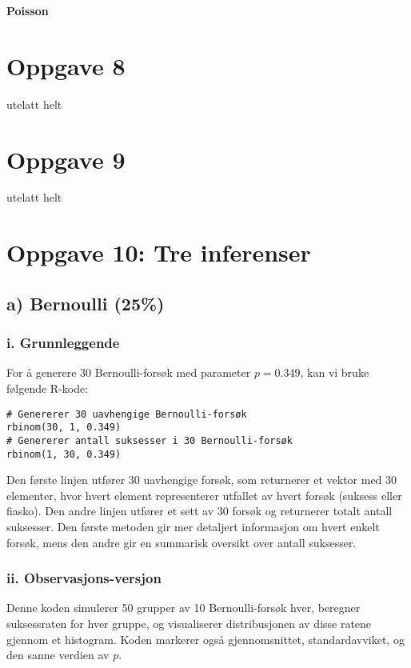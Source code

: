 \documentclass{article}
\begin{document}
\newpage

\bf{Poisson}
\section{Oppgave 8}
utelatt helt

\section{Oppgave 9}
utelatt helt

\section{Oppgave 10: Tre inferenser}

\subsection*{a) Bernoulli (25\%)}

\subsubsection*{i. Grunnleggende}

For å generere 30 Bernoulli-forsøk med parameter \(p = 0.349\), kan vi bruke følgende R-kode:

\begin{verbatim}
# Genererer 30 uavhengige Bernoulli-forsøk
rbinom(30, 1, 0.349)
# Genererer antall suksesser i 30 Bernoulli-forsøk
rbinom(1, 30, 0.349)
\end{verbatim}

Den første linjen utfører 30 uavhengige forsøk, som returnerer et vektor med 30 elementer, hvor hvert element representerer utfallet av hvert forsøk (suksess eller fiasko). Den andre linjen utfører et sett av 30 forsøk og returnerer totalt antall suksesser. Den første metoden gir mer detaljert informasjon om hvert enkelt forsøk, mens den andre gir en summarisk oversikt over antall suksesser.

\subsubsection*{ii. Observasjons-versjon}

Denne koden simulerer 50 grupper av 10 Bernoulli-forsøk hver, beregner suksessraten for hver gruppe, og visualiserer distribusjonen av disse ratene gjennom et histogram. Koden markerer også gjennomsnittet, standardavviket, og den sanne verdien av \(p\).
\end{document}
